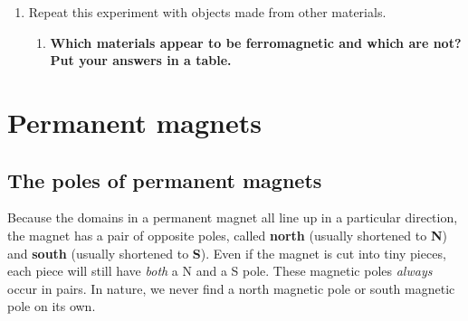 {\begin{enumerate}
\item Repeat this experiment with objects made from other materials. \\
  \begin{enumerate}
  \item \textbf{Which materials appear to be ferromagnetic and which are not? Put your answers in a table.}
  \end{enumerate}

\end{enumerate}
}



\section{Permanent magnets}

\subsection{The poles of permanent magnets}

Because the domains in a permanent magnet all line up in a particular direction, the magnet has a pair of opposite poles, called \textbf{north} (usually shortened to \textbf{N}) and \textbf{south} (usually shortened to \textbf{S}). Even if the magnet is cut into tiny pieces, each piece will still have \textit{both} a N and a S pole. These magnetic poles \textit{always} occur in pairs. In nature, we never find a north magnetic pole or south magnetic pole on its own.

